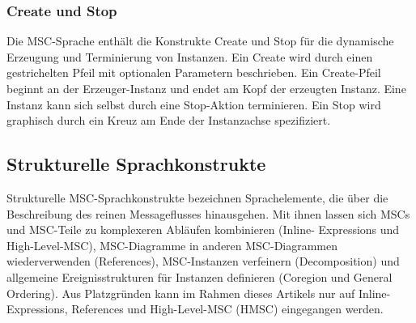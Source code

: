 \subsubsection{Create und Stop}
Die MSC-Sprache enthält die Konstrukte Create und Stop
für die dynamische Erzeugung und Terminierung von Instanzen.
Ein Create wird durch einen gestrichelten Pfeil
mit optionalen Parametern beschrieben. Ein Create-Pfeil
beginnt an der Erzeuger-Instanz und endet am Kopf der erzeugten
Instanz. Eine Instanz kann sich selbst durch eine
Stop-Aktion terminieren. Ein Stop wird graphisch durch ein
Kreuz am Ende der Instanzachse spezifiziert.\\

\subsection{Strukturelle Sprachkonstrukte}
Strukturelle MSC-Sprachkonstrukte bezeichnen Sprachelemente,
die über die Beschreibung des reinen Messageflusses
hinausgehen. Mit ihnen lassen sich MSCs und
MSC-Teile zu komplexeren Abläufen kombinieren (Inline-
Expressions und High-Level-MSC), MSC-Diagramme in
anderen MSC-Diagrammen wiederverwenden (References),
MSC-Instanzen verfeinern (Decomposition) und allgemeine
Ereignisstrukturen für Instanzen definieren (Coregion und
General Ordering). Aus Platzgründen kann im Rahmen
dieses Artikels nur auf Inline-Expressions, References und
High-Level-MSC (HMSC) eingegangen werden.\\

